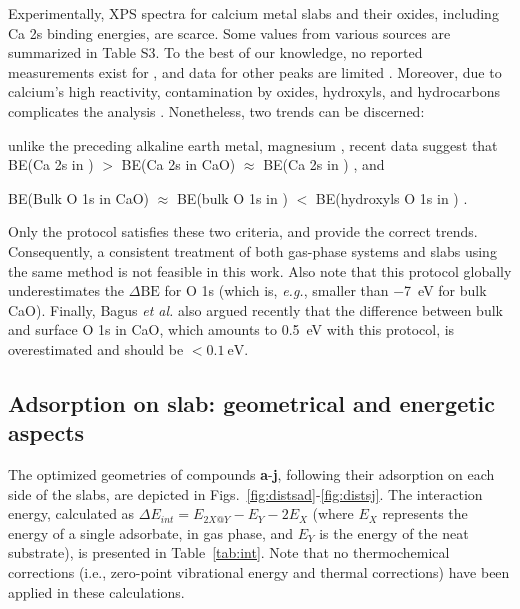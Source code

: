 \documentclass[%
aip,
amsmath,amssymb,
preprint,%
jcp,
showkeys,
]{revtex4-2}
\def\dbe{\ensuremath{\Delta\text{BE}}}
\begin{document}
Experimentally, XPS spectra for calcium metal slabs and their oxides, including Ca 2s binding energies, are scarce. Some values from various sources are summarized in Table S3. To the best of our knowledge, no reported measurements exist for , and data for other peaks are limited \cite{franzenXPSSpectraCrystalline1977,sveinbjornssonIonicConductivityFormation2014}. Moreover, due to calcium's high reactivity, contamination by oxides, hydroxyls, and hydrocarbons complicates the analysis \cite{dupinSystematicXPSStudies2000,bebenseeAdsorptionOxygenWater2008,fujimoriInteractionWaterCaO2016a,cristXPSLibraryWebsite2021a}. Nonetheless, two trends can be discerned: \begin{inparaenum}[(i)]
	\item unlike the preceding alkaline earth metal, magnesium \cite{dobrovolskyXPSStudyInfluence2017}, recent data suggest that BE(Ca 2s in ) $>$ BE(Ca 2s in CaO) $\approx$ BE(Ca 2s in ) \cite{ochsCO2ChemisorptionCa1998,cristHandbookMonochromaticXPS2000a,cristXPSLibraryWebsite2021a}, and 
	\item BE(Bulk O 1s in CaO) $\approx$ BE(bulk O 1s in ) $<$ BE(hydroxyls O 1s in ) \cite{dupinSystematicXPSStudies2000,bebenseeAdsorptionOxygenWater2008,fujimoriInteractionWaterCaO2016a,cristXPSLibraryWebsite2021a}.
\end{inparaenum}
Only the  protocol satisfies these two criteria, and provide the correct trends. Consequently, a consistent treatment of both gas-phase systems and slabs using the same method is not feasible in this work. Also note that this protocol globally underestimates the \dbe{} for O 1s (which is, \textit{e.g.}, smaller than \SI{-7}{\electronvolt} for bulk CaO\cite{cristXPSLibraryWebsite2021a}). Finally, Bagus \emph{et al.}\cite{bagusRevisitingSurfaceCorelevel2019} also argued recently that the difference between bulk and surface O 1s in CaO, which amounts to \SI{0.5}{\electronvolt} with this protocol, is overestimated  and should be $<\SI{0.1}{\electronvolt}$.



\clearpage

\subsection{Adsorption on slab: geometrical and energetic aspects}\label{sec:geom}

The optimized geometries of compounds \textbf{a}-\textbf{j}, following their adsorption on each side of the slabs, are depicted in Figs.~\ref{fig:distsad}-\ref{fig:distsj}. The interaction energy, calculated as $\Delta E_{int} = E_{2X@Y} - E_Y - 2E_X$ (where $E_X$ represents the energy of a single adsorbate, in gas phase, and $E_Y$ is the energy of the neat substrate), is presented in Table~\ref{tab:int}. Note that no thermochemical corrections (i.e., zero-point vibrational energy and thermal corrections) have been applied in these calculations.
\end{document}
